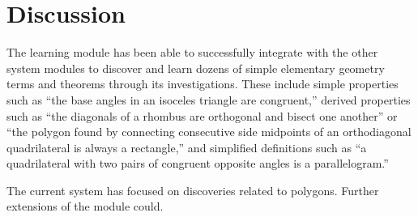 \newpage
\section{Discussion}

The learning module has been able to successfully integrate with the
other system modules to discover and learn dozens of simple elementary
geometry terms and theorems through its investigations. These include
simple properties such as ``the base angles in an isoceles triangle
are congruent,'' derived properties such as ``the diagonals of a
rhombus are orthogonal and bisect one another'' or ``the polygon found
by connecting consecutive side midpoints of an orthodiagonal
quadrilateral is always a rectangle,'' and simplified definitions such
as ``a quadrilateral with two pairs of congruent opposite angles is a
parallelogram.''

The current system has focused on discoveries related to
polygons. Further extensions of the module could.
